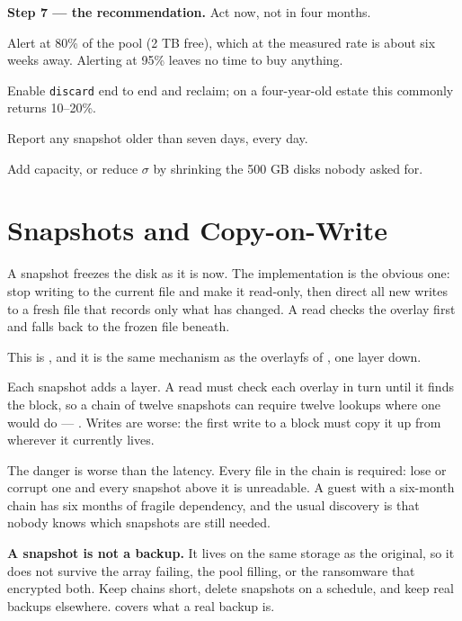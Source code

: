 \begin{worked}
\smallskip
\textbf{Step 7 --- the recommendation.} Act now, not in four months.
\begin{tight}
  \item Alert at 80\% of the pool (2 TB free), which at the measured rate is
        about six weeks away. Alerting at 95\% leaves no time to buy anything.
  \item Enable \texttt{discard} end to end and reclaim; on a four-year-old
        estate this commonly returns 10--20\%.
  \item Report any snapshot older than seven days, every day.
  \item Add capacity, or reduce $\sigma$ by shrinking the 500 GB disks nobody
        asked for.
\end{tight}
\end{worked}

\section{Snapshots and Copy-on-Write}

A snapshot freezes the disk as it is now. The implementation is the obvious
one: stop writing to the current file and make it read-only, then direct all
new writes to a fresh  file that records only what has changed.
A read checks the overlay first and falls back to the frozen file beneath.

This is , and it is the same mechanism as the overlayfs of
, one layer down.

\begin{conceptbox}
Each snapshot adds a layer. A read must check each overlay in turn until it
finds the block, so a chain of twelve snapshots can require twelve lookups
where one would do --- . Writes are worse: the first
write to a block must copy it up from wherever it currently lives.

\smallskip
The danger is worse than the latency. Every file in the chain is required: lose
or corrupt one and every snapshot above it is unreadable. A guest with a
six-month chain has six months of fragile dependency, and the usual
discovery is that nobody knows which snapshots are still needed.

\smallskip
\textbf{A snapshot is not a backup.} It lives on the same storage as the
original, so it does not survive the array failing, the pool filling, or the
ransomware that encrypted both. Keep chains short, delete snapshots on a
schedule, and keep real backups elsewhere.  covers what a real
backup is.
\end{conceptbox}

